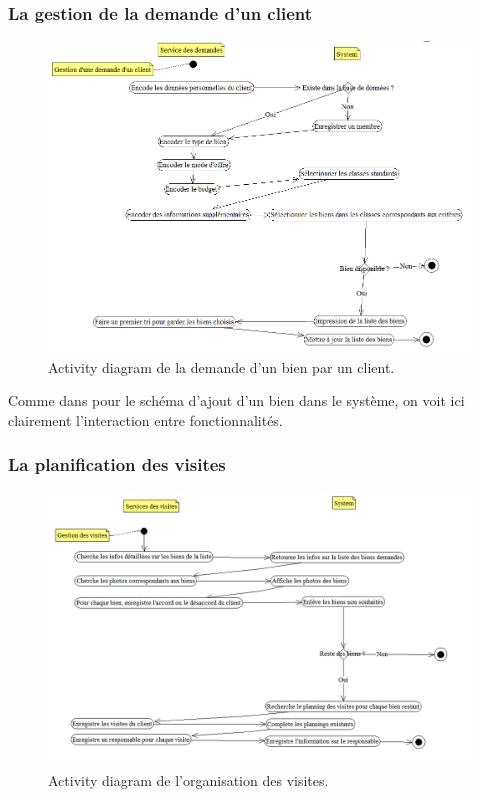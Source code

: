 \subsubsection{La gestion de la demande d'un client}
\begin{figure}[H]
\centering
\includegraphics[width=16cm]{demandeBien.png}
\caption{Activity diagram de la demande d'un bien par un client.}
\label{fig:demandeBien}
\end{figure}
Comme dans pour le schéma d'ajout d'un bien dans le système, on voit ici clairement l'interaction entre fonctionnalités.

\subsubsection{La planification des visites}
\begin{figure}[H]
\centering
\includegraphics[width=16cm]{visites.png}
\caption{Activity diagram de l'organisation des visites.}
\label{fig:visites}
\end{figure}


